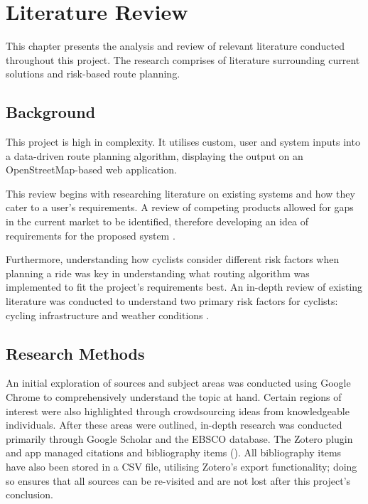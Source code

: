 \chapter{Literature Review} 
\label{chap:litrev}

This chapter presents the analysis and review of relevant literature conducted throughout this project. The research comprises of literature surrounding current solutions and risk-based route planning.

\section{Background}
\label{litrev:background}
This project is high in complexity. It utilises custom, user and system inputs into a data-driven route planning algorithm, displaying the output on an OpenStreetMap-based web application. 

This review begins with researching literature on existing systems and how they cater to a user's requirements. A review of competing products allowed for gaps in the current market to be identified, therefore developing an idea of requirements for the proposed system . 

Furthermore, understanding how cyclists consider different risk factors when planning a ride was key in understanding what routing algorithm was implemented to fit the project's requirements best. An in-depth review of existing literature was conducted to understand two primary risk factors for cyclists: cycling infrastructure  and weather conditions . 

\section{Research Methods}
\label{litrev:researchmethod}

An initial exploration of sources and subject areas was conducted using Google Chrome to comprehensively understand the topic at hand. Certain regions of interest were also highlighted through crowdsourcing ideas from knowledgeable individuals. After these areas were outlined, in-depth research was conducted primarily through Google Scholar and the EBSCO database. The Zotero plugin and app managed citations and bibliography items (\cite{noauthor_zotero_nodate}). All bibliography items have also been stored in a CSV file, utilising Zotero's export functionality; doing so ensures that all sources can be re-visited and are not lost after this project's conclusion.

